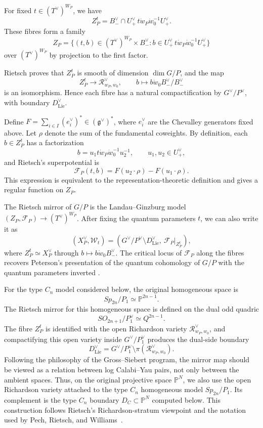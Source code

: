 \documentclass{article}
\newcommand{\PP}{\mathbb{P}}
\begin{document}
For fixed \(t\in (T^\vee)^{W_P}\), we have 
\[
Z_P^t=B_-^\vee\cap U_+^\vee\,t\dot w_P\dot w_0^{-1}U_+^\vee .
\]
These fibres form a family
\[
Z_P=
\{(t,b)\in (T^\vee)^{W_P}\times B_-^\vee:
b\in U_+^\vee\,t\dot w_P\dot w_0^{-1}U_+^\vee\}
\]
over \((T^\vee)^{W_P}\) by projection to the first factor. 

Rietsch proves that \(Z_P^t\) is smooth of dimension \(\dim G/P\), and the map
\[
Z_P^t\longrightarrow \mathcal R_{w_P,w_0}^\vee,\qquad
b\longmapsto b\dot w_0B_-^\vee/B_-^\vee
\]
is an isomorphism. Hence each fibre has a natural compactification by \(G^\vee/P^\vee\), with boundary \(D_{\mathrm{Lie}}^\vee\).

Define \(F=\sum_{i\in I}(e_i^\vee)^*\in(\mathfrak g^\vee)^*\), where \(e_i^\vee\) are the Chevalley generators fixed above. Let \(\rho\) denote the sum of the fundamental coweights. By definition, each \(b\in Z_P^t\) has a factorization
\[
b=u_1t\dot w_P\dot w_0^{-1}u_2^{-1},
\qquad u_1,u_2\in U_+^\vee,
\]
and Rietsch's superpotential \cite{Rietsch} is
\[
\mathcal F_P(t,b)=F(u_2\cdot\rho)-F(u_1\cdot\rho).
\]
This expression is equivalent to the representation-theoretic definition and gives a regular function on \(Z_P\).

The Rietsch mirror of \(G/P\) is the Landau--Ginzburg model \((Z_P,\mathcal F_P)\to (T^\vee)^{W_P}\). After fixing the quantum parameters \(t\), we can also write it as
\[
\left(X_P^\vee,\mathcal W_t\right)
=
\left(G^\vee/P^\vee\setminus D_{\mathrm{Lie}}^\vee,\ \mathcal F_P|_{Z_P^t}\right),
\]
where \(Z_P^t\simeq X_P^\vee\) through \(b\mapsto b\dot w_0B_-^\vee\). The critical locus of \(\mathcal F_P\) along the fibres recovers Peterson's presentation of the quantum cohomology of \(G/P\) with the quantum parameters inverted \cite{Peterson,LS}.

For the type \(C_n\) model considered below, the original homogeneous space is
\[
Sp_{2n}/P_1\simeq \PP^{2n-1}.
\]
The Rietsch mirror for this homogeneous space is defined on the dual odd quadric
\[
SO_{2n+1}/P_1^\vee\simeq Q^{2n-1}.
\]
The fibre \(Z_P^t\) is identified with the open Richardson variety \(\mathcal R_{w_P,w_0}^\vee\), and compactifying this open variety inside \(G^\vee/P_1^\vee\) produces the dual-side boundary
\[
D_{\mathrm{Lie}}^\vee
=
G^\vee/P_1^\vee\setminus \pi(\mathcal R_{w_P,w_0}^\vee).
\]
Following the philosophy of the Gross--Siebert program, the mirror map should be viewed as a relation between log Calabi--Yau pairs, not only between the ambient spaces. Thus, on the original projective space \(\PP^N\), we also use the open Richardson variety attached to the type \(C_n\) homogeneous model \(Sp_{2n}/P_1\). Its complement is the type \(C_n\) boundary \(D_C\subset\PP^N\) computed below. This construction follows Rietsch's Richardson-stratum viewpoint and the notation used by Pech, Rietsch, and Williams~\cite{Rietsch,PRW}.
\end{document}
